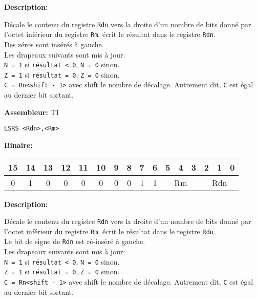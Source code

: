 \documentclass{article}
\begin{document}

    \textbf{Description: }

    Décale le contenu du registre \texttt{Rdn} vers la droite d'un nombre de bits donné par l'octet inférieur du registre \texttt{Rm}, écrit le résultat dans le registre \texttt{Rdn}.\\
    Des zéros sont insérés à gauche.\\
    Les drapeaux suivants sont mis à jour:\\
    \texttt{N = 1} si \texttt{résultat < 0}, \texttt{N = 0} sinon.\\
    \texttt{Z = 1} si \texttt{résultat = 0}, \texttt{Z = 0} sinon.\\
    \texttt{C = Rn<shift - 1>} avec shift le nombre de décalage.
    Autrement dit, \texttt{C} est égal au dernier bit sortant.

    \textbf{Assembleur:} T1

    \begin{lstlisting}
LSRS <Rdn>,<Rm>
    \end{lstlisting}

    \textbf{Binaire:}

    \begin{tabular}{| c c c c c c c c c c c c c c c c |}
        \hline
        15 & 14 & 13 & 12 & 11 & 10 & \multicolumn{1}{|c}{9} & 8 & 7 & 6 & \multicolumn{1}{|c}{5} & 4 & 3 & \multicolumn{1}{|c}{2} & 1 & 0 \\
        \hline
        0 & 1 & 0 & 0 & 0 & 0 & \multicolumn{1}{|c}{0} & 0 & 1 & 1 & \multicolumn{3}{|c}{Rm} & \multicolumn{3}{|c|}{Rdn} \\
        \hline
    \end{tabular}



    \textbf{Description: }

    Décale le contenu du registre \texttt{Rdn} vers la droite d'un nombre de bits donné par l'octet inférieur du registre \texttt{Rm}, écrit le résultat dans le registre \texttt{Rdn}.\\
    Le bit de signe de \texttt{Rdn} est ré-inséré à gauche.\\
    Les drapeaux suivants sont mis à jour:\\
    \texttt{N = 1} si \texttt{résultat < 0}, \texttt{N = 0} sinon.\\
    \texttt{Z = 1} si \texttt{résultat = 0}, \texttt{Z = 0} sinon.\\
    \texttt{C = Rn<shift - 1>} avec shift le nombre de décalage.
    Autrement dit, \texttt{C} est égal au dernier bit sortant.
\end{document}
